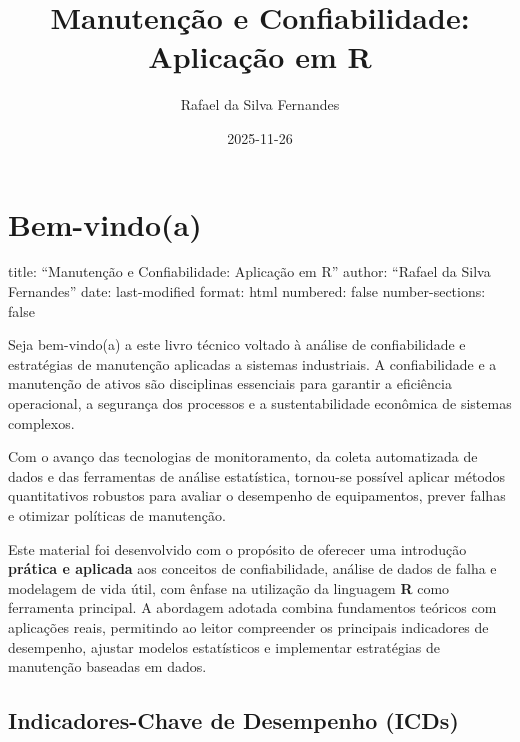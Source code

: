 \documentclass[
  letterpaper,
]{book}
\title{Manutenção e Confiabilidade: Aplicação em R}
\author{Rafael da Silva Fernandes}
\date{2025-11-26}
\renewcommand*\contentsname{Table of contents}
\newcommand\contentsname{Table of contents}
\begin{document}
\frontmatter
\maketitle

\renewcommand*\contentsname{Table of contents}
{
\setcounter{tocdepth}{2}
\tableofcontents
}

\mainmatter
{}

\chapter*{Bem-vindo(a)}\label{bem-vindoa}


title: ``Manutenção e Confiabilidade: Aplicação em R'' author: ``Rafael
da Silva Fernandes'' date: last-modified format: html numbered: false
number-sections: false

Seja bem-vindo(a) a este livro técnico voltado à análise de
confiabilidade e estratégias de manutenção aplicadas a sistemas
industriais. A confiabilidade e a manutenção de ativos são disciplinas
essenciais para garantir a eficiência operacional, a segurança dos
processos e a sustentabilidade econômica de sistemas complexos.

Com o avanço das tecnologias de monitoramento, da coleta automatizada de
dados e das ferramentas de análise estatística, tornou-se possível
aplicar métodos quantitativos robustos para avaliar o desempenho de
equipamentos, prever falhas e otimizar políticas de manutenção.

Este material foi desenvolvido com o propósito de oferecer uma
introdução \textbf{prática e aplicada} aos conceitos de confiabilidade,
análise de dados de falha e modelagem de vida útil, com ênfase na
utilização da linguagem \textbf{R} como ferramenta principal. A
abordagem adotada combina fundamentos teóricos com aplicações reais,
permitindo ao leitor compreender os principais indicadores de
desempenho, ajustar modelos estatísticos e implementar estratégias de
manutenção baseadas em dados.

\section*{Indicadores-Chave de Desempenho
(ICDs)}\label{indicadores-chave-de-desempenho-icds}

\end{document}
